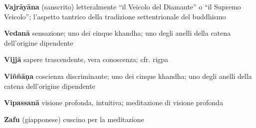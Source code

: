 \textbf{Vajrāyāna} (sanscrito) letteralmente ``il Veicolo del Diamante'' o ``il Supremo Veicolo''; l'aspetto tantrico della tradizione settentrionale del buddhismo

\textbf{Vedanā }sensazione; uno dei cinque khandha; uno degli anelli della catena dell'origine dipendente

\textbf{Vijjā }sapere trascendente, vera conoscenza; cfr. rigpa

\textbf{Viññāṇa }coscienza discriminante; uno dei cinque khandha; uno degli anelli della catena dell'origine dipendente

\textbf{Vipassanā }visione profonda, intuitiva; meditazione di visione profonda

\textbf{Zafu} (giapponese) cuscino per la meditazione

\endgroup
